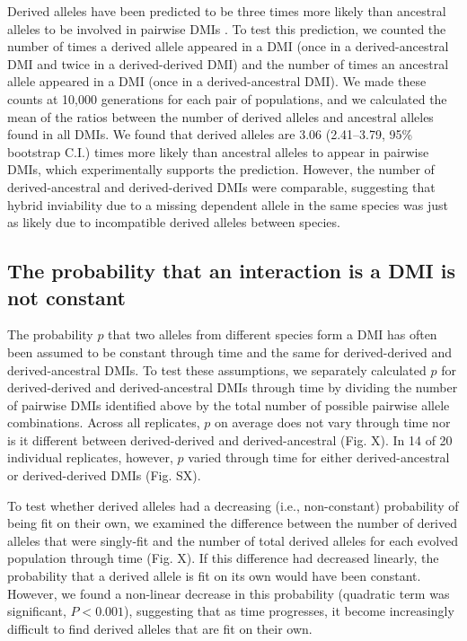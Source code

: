 \begin{doublespace}
Derived alleles have been predicted to be three times more likely
than ancestral alleles to be involved in pairwise DMIs \citep{orr95}.
%
To test this prediction, we counted the number of times
a derived allele appeared in a DMI
(once in a derived-ancestral DMI and twice in a derived-derived DMI)
and the number of times an ancestral allele appeared in a DMI
(once in a derived-ancestral DMI).
%
We made these counts at 10,000 generations for each pair of populations,
and we calculated the mean of the ratios between the number of derived alleles
and ancestral alleles found in all DMIs.
%
We found that derived alleles are 3.06 (2.41--3.79, 95\% bootstrap C.I.)
times more likely than ancestral alleles to appear in pairwise DMIs,
which experimentally supports the prediction.
%
However, the number of derived-ancestral and derived-derived DMIs
were comparable, suggesting that hybrid inviability due to
a missing dependent allele in the same species was just as likely due to
incompatible derived alleles between species.



\subsection{The probability that an interaction is a DMI is not constant}

The probability $p$ that two alleles from different species
form a DMI has often been assumed to be constant through time
and the same for derived-derived and derived-ancestral DMIs.
%
To test these assumptions, we separately calculated $p$
for derived-derived and derived-ancestral DMIs
through time by dividing the number of pairwise DMIs identified above
by the total number of possible pairwise allele combinations.
%
Across all replicates, $p$ on average does not vary through time
nor is it different between derived-derived and derived-ancestral (Fig. X).
%
In 14 of 20 individual replicates, however, $p$ varied through time
for either derived-ancestral or derived-derived DMIs (Fig. SX).



To test whether derived alleles had a decreasing (i.e., non-constant)
probability of being fit on their own,
we examined the difference between the number of derived alleles that
were singly-fit and the number of total derived alleles
for each evolved population through time (Fig. X).
%
If this difference had decreased linearly, the probability that
a derived allele is fit on its own would have been constant.
%
However, we found a non-linear decrease in this probability
(quadratic term was significant, $P < 0.001$),
suggesting that as time progresses, it become increasingly difficult
to find derived alleles that are fit on their own.


\end{doublespace}
